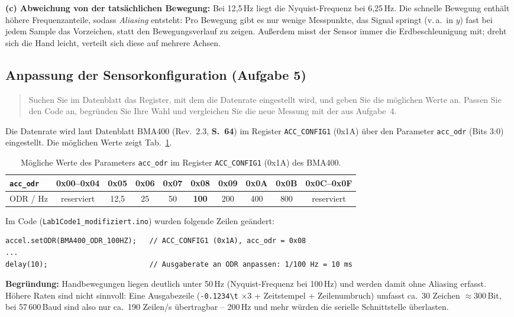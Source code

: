 \documentclass[a4paper,oneside,10pt]{article}
\begin{document}
\textbf{(c) Abweichung von der tatsächlichen Bewegung:} Bei 12{,}5\,Hz liegt die
Nyquist-Frequenz bei 6{,}25\,Hz. Die schnelle Bewegung enthält höhere
Frequenzanteile, sodass \emph{Aliasing} entsteht: Pro Bewegung gibt es nur wenige
Messpunkte, das Signal springt (v.\,a.\ in $y$) fast bei jedem Sample das Vorzeichen,
statt den Bewegungsverlauf zu zeigen. Außerdem misst der Sensor immer die
Erdbeschleunigung mit; dreht sich die Hand leicht, verteilt sich diese auf
mehrere Achsen.

\subsection{Anpassung der Sensorkonfiguration (Aufgabe 5)}

\begin{quote}
Suchen Sie im Datenblatt das Register, mit dem die Datenrate eingestellt wird, und
geben Sie die möglichen Werte an. Passen Sie den Code an, begründen Sie Ihre Wahl
und vergleichen Sie die neue Messung mit der aus Aufgabe~4.
\end{quote}

Die Datenrate wird laut Datenblatt BMA400 \cite{bma400} (Rev.~2.3, \textbf{S.~64})
im Register \texttt{ACC\_CONFIG1} (0x1A) über den Parameter \texttt{acc\_odr}
(Bits 3:0) eingestellt. Die möglichen Werte zeigt Tab.~\ref{tab:odr}.

\begin{table}[H]
\centering
\small
\caption{Mögliche Werte des Parameters \texttt{acc\_odr} im Register \texttt{ACC\_CONFIG1} (0x1A) des BMA400.}
\label{tab:odr}
\begin{tabular}{lccccccccc}
\toprule
\texttt{acc\_odr} & 0x00--0x04 & 0x05 & 0x06 & 0x07 & \textbf{0x08} & 0x09 & 0x0A & 0x0B & 0x0C--0x0F \\
\midrule
ODR / Hz & reserviert & 12{,}5 & 25 & 50 & \textbf{100} & 200 & 400 & 800 & reserviert \\
\bottomrule
\end{tabular}
\end{table}

Im Code (\texttt{Lab1Code1\_modifiziert.ino}) wurden folgende Zeilen geändert:
\begin{lstlisting}
accel.setODR(BMA400_ODR_100HZ);   // ACC_CONFIG1 (0x1A), acc_odr = 0x08
...
delay(10);                        // Ausgaberate an ODR anpassen: 1/100 Hz = 10 ms
\end{lstlisting}

\textbf{Begründung:} Handbewegungen liegen deutlich unter 50\,Hz (Nyquist-Frequenz
bei 100\,Hz) und werden damit ohne Aliasing erfasst. Höhere Raten sind nicht
sinnvoll: Eine Ausgabezeile (\texttt{-0.1234\textbackslash t} $\times 3$ + Zeitstempel
+ Zeilenumbruch) umfasst ca.\ 30 Zeichen $\approx 300$\,Bit, bei 57\,600\,Baud sind
also nur ca.\ 190 Zeilen/s übertragbar -- 200\,Hz und mehr würden die serielle
Schnittstelle überlasten.
\end{document}
